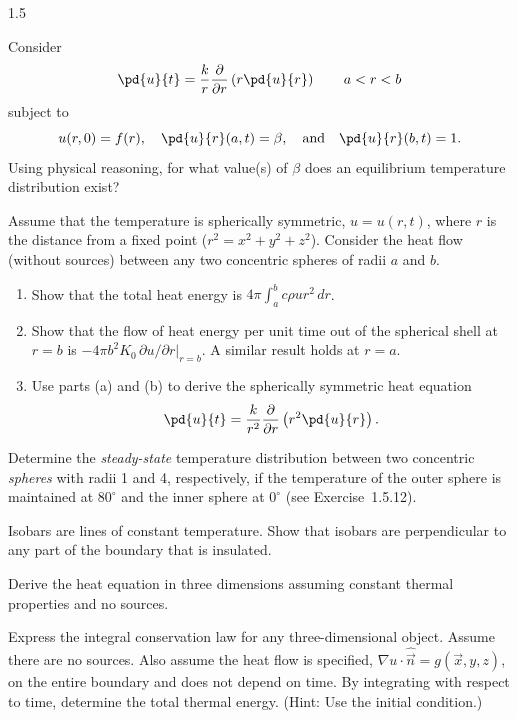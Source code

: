 \begin{exercises}{1.5}
\item[\starred 1.5.11.] Consider
\[
\pd{u}{t} = \frac{k}{r}\frac{\partial}{\partial r}\left(r\pd{u}{r}\right) \qquad a < r < b
\]
subject to
\[
u(r,0) = f(r), \quad \pd{u}{r}(a,t) = \beta, \quad \text{and} \quad \pd{u}{r}(b,t) = 1.
\]
Using physical reasoning, for what value(s) of $\beta$ does an equilibrium temperature distribution exist?

\item Assume that the temperature is spherically symmetric, $u = u(r,t)$, where $r$ is the distance from a fixed point ($r^2 = x^2 + y^2 + z^2$). Consider the heat flow (without sources) between any two concentric spheres of radii $a$ and $b$.
\begin{enumerate}
\item[(a)] Show that the total heat energy is $4\pi\int_a^b c\rho u r^2\,dr$.
\item[(b)] Show that the flow of heat energy per unit time out of the spherical shell at $r = b$ is $-4\pi b^2 K_0\,\partial u/\partial r\big|_{r=b}$. A similar result holds at $r = a$.
\item[(c)] Use parts (a) and (b) to derive the spherically symmetric heat equation
\[
\pd{u}{t} = \frac{k}{r^2}\frac{\partial}{\partial r}\left(r^2\pd{u}{r}\right).
\]
\end{enumerate}

\item[\starred 1.5.13.] Determine the \emph{steady-state} temperature distribution between two concentric \emph{spheres} with radii 1 and 4, respectively, if the temperature of the outer sphere is maintained at $80^\circ$ and the inner sphere at $0^\circ$ (see Exercise~1.5.12).

\item Isobars are lines of constant temperature. Show that isobars are perpendicular to any part of the boundary that is insulated.

\item Derive the heat equation in three dimensions assuming constant thermal properties and no sources.

\item Express the integral conservation law for any three-dimensional object. Assume there are no sources. Also assume the heat flow is specified, $\nabla u\cdot\hat{\vec{n}} = g(\vec{x},y,z)$, on the entire boundary and does not depend on time. By integrating with respect to time, determine the total thermal energy. (Hint: Use the initial condition.)


\end{exercises}
